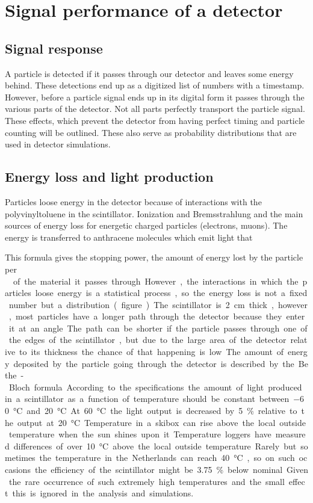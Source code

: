 \section{Signal performance of a detector}


\subsection{Signal response}

A particle is detected if it passes through our detector and leaves some
energy behind. These detections end up as a digitized list of numbers
with a timestamp. However, before a particle signal ends up in its
digital form it passes through the various parts of the detector. Not
all parts perfectly transport the particle signal. These effects, which
prevent the detector from having perfect timing and particle counting
will be outlined. These also serve as probability distributions that are
used in detector simulations.


\subsection{Energy loss and light production}

Particles loose energy in the detector because of interactions with the
polyvinyltoluene in the scintillator. Ionization and Bremsstrahlung and
the main sources of energy loss for energetic charged particles
(electrons, muons). The energy is transferred to anthracene molecules which emit light that

This formula gives the stopping power, the amount of energy
lost by the particle per \SI{}{\gram\centi\meter\square} of the material
it passes through. However, the interactions in which the particles
loose energy is a statistical process, so the energy loss is not a fixed
number but a distribution. (figure...)

The scintillator is \SI{2}{\centi\meter} thick, however, most particles
have a longer path through the detector because they enter it at an
angle. The path can be shorter if the particle passes through one of the
edges of the scintillator, but due to the large area of the detector
relative to its thickness the chance of that happening is low. The
amount of energy deposited by the particle going through the detector is
described by the Bethe-Bloch formula. 

According to the specifications the amount of light produced in a
scintillator as a function of temperature should be constant between
\SI{-60}{\degreeCelsius} and \SI{20}{\degreeCelsius}. At
\SI{60}{\degreeCelsius} the light output is decreased by
\SI{5}{\percent} relative to the output at \SI{20}{\degreeCelsius}.
Temperature in a skibox can rise above the local outside temperature
when the sun shines upon it. Temperature loggers have measured
differences of over \SI{10}{\degreeCelsius} above the local outside
temperature. Rarely but sometimes the temperature in the Netherlands can
reach \SI{40}{\degreeCelsius}, so on such occasions the efficiency of
the scintillator might be \SI{3.75}{\percent} below nominal. Given the
rare occurrence of such extremely high temperatures and the small effect
this is ignored in the analysis and simulations.


